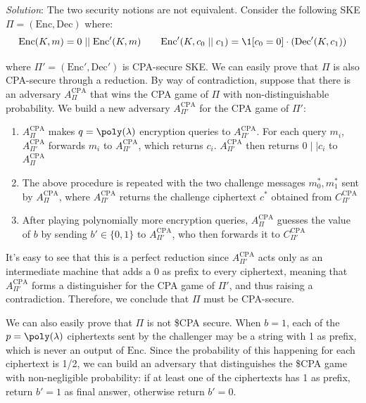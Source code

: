 \documentclass[a4paper, 12pt]{report}
\begin{document}
    \textit{Solution}: The two security notions are not equivalent. Consider the following SKE $\Pi = (\mathrm{Enc}, \mathrm{Dec})$ where:
    \[\mathrm{Enc}(K, m) = 0 \mid\mid \mathrm{Enc}'(K,m) \qquad \mathrm{Enc}'(K, c_0\mid\mid c_1) = \1[c_0 = 0] \cdot (\mathrm{Dec}'(K,c_1))\]

    where $\Pi' = (\mathrm{Enc}', \mathrm{Dec}')$ is CPA-secure SKE. We can easily prove that $\Pi$ is also CPA-secure through a reduction. By way of contradiction, suppose that there is an adversary $A^{\text{CPA}}_{\Pi}$ that wins the CPA game of $\Pi$ with non-distinguishable probability. We build a new adversary $A^{\text{CPA}}_{\Pi'}$ for the CPA game of $\Pi'$:
    \begin{enumerate}
        \item $A^{\text{CPA}}_{\Pi}$ makes $q = \poly(\lambda)$ encryption queries to $A^{\text{CPA}}_{\Pi'}$. For each query $m_i$, $A^{\text{CPA}}_{\Pi'}$ forwards $m_i$ to $A^{\text{CPA}}_{\Pi'}$, which returns $c_i$. $A^{\text{CPA}}_{\Pi'}$ then returns $0 \mid\mid c_i$ to $A^{\text{CPA}}_{\Pi}$
        \item The above procedure is repeated with the two challenge messages $m_0^*, m_1^*$ sent by $A^{\text{CPA}}_{\Pi}$, where $A^{\text{CPA}}_{\Pi'}$ returns the challenge ciphertext $c^*$ obtained from $C^{\text{CPA}}_{\Pi'}$
        \item After playing polynomially more encryption queries, $A^{\text{CPA}}_{\Pi}$ guesses the value of $b$ by sending $b' \in \{0,1\}$ to $A^{\text{CPA}}_{\Pi'}$, who then forwards it to $C^{\text{CPA}}_{\Pi'}$
    \end{enumerate}

    It's easy to see that this is a perfect reduction since $A^{\text{CPA}}_{\Pi'}$ acts only as an intermediate machine that adds a 0 as prefix to every ciphertext, meaning that $A^{\text{CPA}}_{\Pi'}$ forms a distinguisher for the CPA game of $\Pi'$, and thus raising a contradiction. Therefore, we conclude that $\Pi$ must be CPA-secure.

    We can also easily prove that $\Pi$ is not \$CPA secure. When $b = 1$, each of the $p = \poly(\lambda)$ ciphertexts sent by the challenger may be a string with 1 as prefix, which is never an output of $\mathrm{Enc}$. Since the probability of this happening for each ciphertext is 1/2, we can build an adversary that distinguishes the \$CPA game with non-negligible probability: if at least one of the ciphertexts has 1 as prefix, return $b' = 1$ as final answer, otherwise return $b' = 0$.
\end{document}
